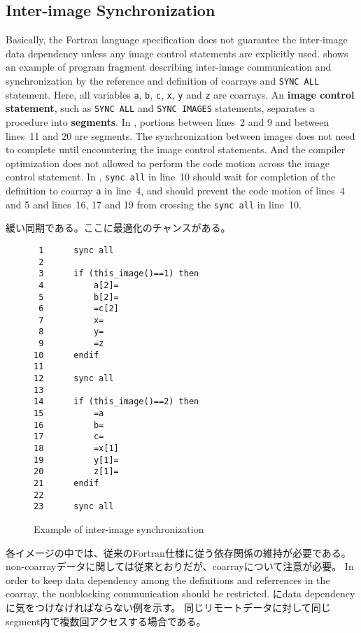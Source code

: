 \subsection{Inter-image Synchronization}
Basically, the Fortran language specification does not guarantee the inter-image 
data dependency unless any image control statements are explicitly used.
 shows an example of program fragment describing inter-image communication
and synchronization by the reference and definition of coarrays and {\tt SYNC ALL} statement.
Here, all variables {\tt a}, {\tt b}, {\tt c}, {\tt x}, {\tt y} and {\tt z} are coarrays.
%
An {\bf image control statement}, such as {\tt SYNC ALL} and {\tt SYNC IMAGES} statements, 
separates a procedure into {\bf segments}. In , portions between lines~2 and 9 and 
between lines~11 and 20 are segments.
The synchronization between images does not need to complete until encountering the 
image control statements. And the compiler optimization does not allowed to perform 
the code motion across the image control statement. In , 
{\tt sync all} in line~10 should wait for completion of the definition to coarray {\tt a} 
in line~4, and should prevent the code motion of lines~4 and 5 and lines~16, 17 and 19 
from crossing the {\tt sync all} in line~10.

緩い同期である。ここに最適化のチャンスがある。

\begin{figure}[hbt]
 \begin{center}
\begin{verbatim}
 1      sync all
 2
 3      if (this_image()==1) then
 4          a[2]=
 5          b[2]=
 6          =c[2]
 7          x=
 8          y=
 9          =z
10      endif
11
12      sync all
13
14      if (this_image()==2) then
15          =a
16          b=
17          c=
18          =x[1]
19          y[1]=
20          z[1]=
21      endif
22
23      sync all

\end{verbatim}
  \caption{Example of inter-image synchronization}
  \label{fig:sync-ex}
 \end{center}
\end{figure}



各イメージの中では、従来のFortran仕様に従う依存関係の維持が必要である。
non-coarrayデータに関しては従来とおりだが、coarrayについて注意が必要。
In order to keep data dependency among the definitions and 
referrences in the coarray, the nonblocking communication should be restricted.
 にdata dependencyに気をつけなければならない例を示す。
同じリモートデータに対して同じsegment内で複数回アクセスする場合である。

